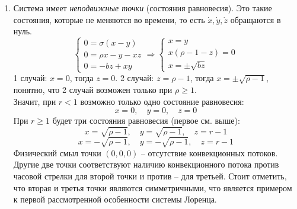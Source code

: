 \documentclass[12pt]{article}
\begin{document}
\begin{enumerate}
\item Система имеет \textit{неподвижные точки} (состояния равновесия). Это такие состояния, которые не меняются во времени, то есть $\dot{x}, \dot{y}, \dot{z}$ обращаются в нуль.
$$\begin{cases}
0=\sigma(x-y) \\
0=\rho x-y-xz \\
0=-bz+xy
\end{cases}
\Rightarrow
\begin{cases}
x=y \\
x(\rho-1-z)=0 \\
x=\pm\sqrt{bz}
\end{cases}$$
1 случай: $x=0$, тогда $z=0$. 2 случай: $z=\rho-1$, тогда $x=\pm\sqrt{\rho-1}$, понятно, что 2 случай возможен только при $\rho \geqslant 1$. 
\\ Значит, при $r < 1$ возможно только одно состояние равновесия:
\begin{equation*}
x=0, \quad y=0, \quad z=0
\end{equation*}
При $r \geqslant 1$ будет три состояния равновесия (первое см. выше):
\begin{equation*}
x=\sqrt{\rho-1}, \quad y=\sqrt{\rho-1}, \quad z=r-1
\end{equation*}
\begin{equation*}
x=-\sqrt{\rho-1}, \quad y=-\sqrt{\rho-1}, \quad z=r-1
\end{equation*}
Физический смыл точки $(0, 0, 0)$ -- отсутствие конвекционных потоков. Другие две точки соответствуют наличию конвекционного потока против часовой стрелки для второй точки и против -- для третьей. Стоит отметить, что вторая и третья точки являются симметричными, что является примером к первой рассмотренной особенности системы Лоренца.


\end{enumerate}
\end{document}
